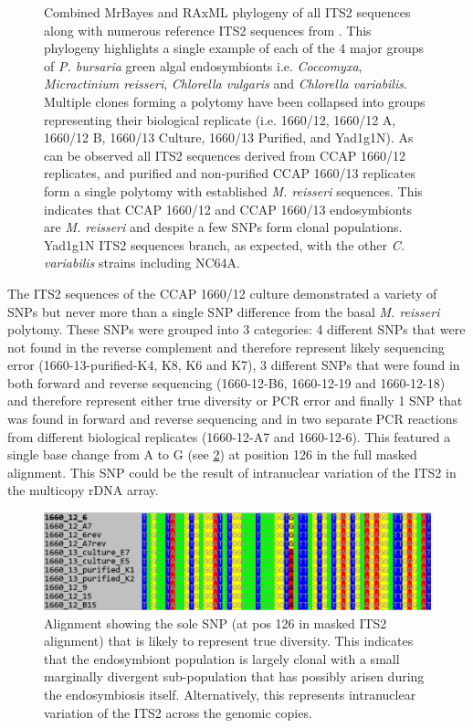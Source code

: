 \begin{figure}
    \caption[ITS2 phylogeny]{Combined MrBayes and RAxML phylogeny of all ITS2 sequences
    along with numerous reference ITS2 sequences from \citep{Hoshina2010,Hoshina2013}.
    This phylogeny highlights a single example of each of the 4 major groups of 
    \textit{P. bursaria} green algal endosymbionts i.e. \textit{Coccomyxa}, \textit{Micractinium reisseri},
    \textit{Chlorella vulgaris} and \textit{Chlorella variabilis}.  Multiple clones
    forming a polytomy have been collapsed into groups representing their biological
    replicate (i.e. 1660/12, 1660/12 A, 1660/12 B, 1660/13 Culture, 1660/13 Purified,
    and Yad1g1N). As can be observed all
    ITS2 sequences derived from CCAP 1660/12 replicates, and purified and non-purified CCAP 1660/13
    replicates form a single polytomy with established \textit{M. reisseri} sequences.  This indicates 
    that CCAP 1660/12 and CCAP 1660/13 endosymbionts are \textit{M. reisseri} and despite a few SNPs
form clonal populations.  Yad1g1N ITS2 sequences branch, as expected, with the other \textit{C. variabilis}
strains including NC64A.}
    \label{fig:its2_phylo}
\end{figure}

The ITS2 sequences of the CCAP 1660/12 culture demonstrated a 
variety of SNPs but never more than a single SNP difference from the basal \textit{M. reisseri}
polytomy.  These SNPs were grouped into 3 categories: 4 different SNPs that were not found in the
reverse complement and therefore represent likely sequencing error (1660-13-purified-K4, K8, K6 and K7),
3 different SNPs that were found in both forward and reverse sequencing (1660-12-B6, 1660-12-19 and 1660-12-18) and therefore
represent either true diversity or PCR error and finally 1 SNP that was found in 
forward and reverse sequencing and in two separate PCR reactions from different biological replicates (1660-12-A7 and 1660-12-6).
This featured a single base change from A to G (see \cref{fig:its2_snp}) at position 126 in the full masked alignment. 
This SNP could be the result of intranuclear variation of the ITS2 in the multicopy rDNA array.

\begin{figure}
    \includegraphics[width=\textwidth]{its_snp.pdf}
    \caption[ITS2 SNP alignment]{Alignment showing the sole SNP (at pos 126 in masked ITS2 alignment)
        that is likely to represent true diversity.  This indicates that the endosymbiont
    population is largely clonal with a small marginally divergent sub-population that has possibly
arisen during the endosymbiosis itself. Alternatively, this represents intranuclear variation of
the ITS2 across the genomic copies.}
    \label{fig:its2_snp}
\end{figure}

